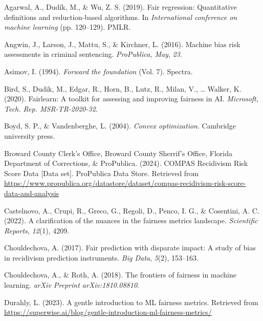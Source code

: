 \documentclass[12pt, twoside]{amherstthesis}
\newenvironment{CSLReferences}[2]%
  {}%
  {\par}
\begin{document}
\hypertarget{refs}{}
\begin{CSLReferences}{1}{0}
\leavevmode{}%
Agarwal, A., Dudík, M., \& Wu, Z. S. (2019). Fair regression: Quantitative definitions and reduction-based algorithms. In \emph{International conference on machine learning} (pp. 120--129). PMLR.

\leavevmode{}%
Angwin, J., Larson, J., Mattu, S., \& Kirchner, L. (2016). Machine bias risk assessments in criminal sentencing. \emph{ProPublica, May}, \emph{23}.

\leavevmode{}%
Asimov, I. (1994). \emph{Forward the foundation} (Vol. 7). Spectra.

\leavevmode{}%
Bird, S., Dudik, M., Edgar, R., Horn, B., Lutz, R., Milan, V., \ldots{} Walker, K. (2020). Fairlearn: A toolkit for assessing and improving fairness in AI. \emph{Microsoft, Tech. Rep. MSR-TR-2020-32}.

\leavevmode{}%
Boyd, S. P., \& Vandenberghe, L. (2004). \emph{Convex optimization}. Cambridge university press.

\leavevmode{}%
Broward County Clerk's Office, Broward County Sherrif's Office, Florida Department of Corrections, \& ProPublica. (2024). {COMPAS Recidivism Risk Score Data} {[}Data set{]}. ProPublica Data Store. Retrieved from \url{https://www.propublica.org/datastore/dataset/compas-recidivism-risk-score-data-and-analysis}

\leavevmode{}%
Castelnovo, A., Crupi, R., Greco, G., Regoli, D., Penco, I. G., \& Cosentini, A. C. (2022). A clarification of the nuances in the fairness metrics landscape. \emph{Scientific Reports}, \emph{12}(1), 4209.

\leavevmode{}%
Chouldechova, A. (2017). Fair prediction with disparate impact: A study of bias in recidivism prediction instruments. \emph{Big Data}, \emph{5}(2), 153--163.

\leavevmode{}%
Chouldechova, A., \& Roth, A. (2018). The frontiers of fairness in machine learning. \emph{arXiv Preprint arXiv:1810.08810}.

\leavevmode{}%
Durahly, L. (2023). A gentle introduction to ML fairness metrics. Retrieved from \url{https://superwise.ai/blog/gentle-introduction-ml-fairness-metrics/}


\end{CSLReferences}
\end{document}
